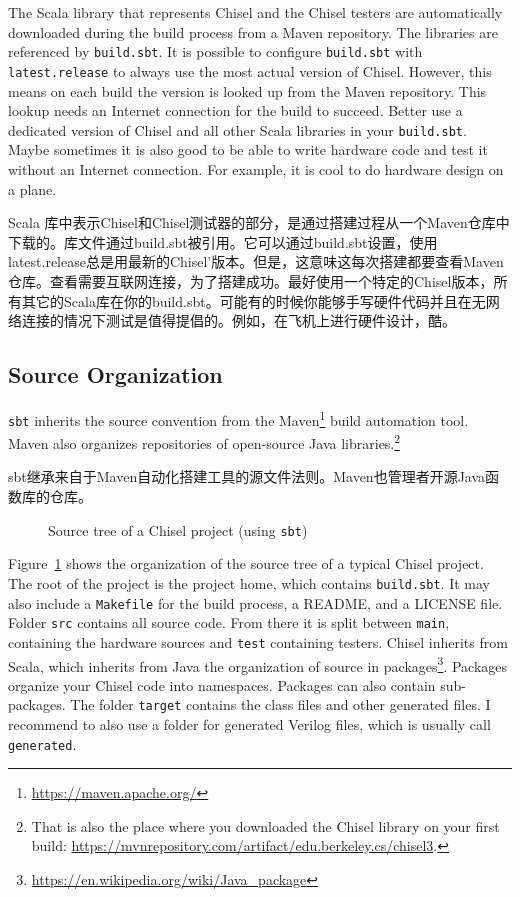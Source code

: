 \documentclass[%
    10pt,
    headinclude, footexclude,
    openright, %
    notitlepage,
    cleardoubleempty,
    headsepline,
    pointlessnumbers,
    bibtotoc, idxtotoc,
    ]{scrbook}
\newcommand{\code}[1]{{\small{\texttt{#1}}}}
\newcommand{\myref}[2]{\href{#1}{#2}}
\renewcommand{\myref}[2]{{#2}{\footnote{\url{#1}}}}
\begin{document}
The Scala library that represents Chisel and the Chisel testers are automatically
downloaded during the build process from a Maven repository.
The libraries are referenced by \code{build.sbt}. It is possible to configure \code{build.sbt}
with \code{latest.release} to always use the most actual version of Chisel.
However, this means on each build the version is looked up from the Maven
repository. This lookup needs an Internet connection for the build to succeed.
Better use a dedicated version of Chisel and all other Scala libraries in your \code{build.sbt}.
Maybe sometimes it is also good to be able to write hardware code and test it without an Internet connection.
For example, it is cool to do hardware design on a plane.

Scala 库中表示Chisel和Chisel测试器的部分，是通过搭建过程从一个Maven仓库中下载的。库文件通过build.sbt被引用。它可以通过build.sbt设置，使用latest.release总是用最新的Chisel'版本。但是，这意味这每次搭建都要查看Maven仓库。查看需要互联网连接，为了搭建成功。最好使用一个特定的Chisel版本，所有其它的Scala库在你的build.sbt。可能有的时候你能够手写硬件代码并且在无网络连接的情况下测试是值得提倡的。例如，在飞机上进行硬件设计，酷。


\subsection{Source Organization}

\code{sbt} inherits the source convention from the \myref{https://maven.apache.org/}{Maven}
build automation tool. Maven also organizes repositories of open-source Java libraries.\footnote{That is
also the place where you downloaded the Chisel library on your first build:
\url{https://mvnrepository.com/artifact/edu.berkeley.cs/chisel3}.}

sbt继承来自于Maven自动化搭建工具的源文件法则。Maven也管理者开源Java函数库的仓库。

\begin{figure}
\caption{Source tree of a Chisel project (using \code{sbt})}
\label{fig:folders}
\end{figure}

Figure~\ref{fig:folders} shows the organization of the source tree of a typical Chisel project.
The root of the project is the project home, which contains \code{build.sbt}.
It may also include a \code{Makefile} for the build process, a README, and a LICENSE file.
Folder \code{src} contains all source code. From there it is split between \code{main},
containing the hardware sources and \code{test} containing testers.
Chisel inherits from Scala, which inherits from Java the organization of source
in \myref{https://en.wikipedia.org/wiki/Java_package}{packages}.
Packages organize your Chisel code into namespaces. Packages can also contain
sub-packages.
The folder \code{target} contains the class files and other generated files.
I recommend to also use a folder for generated Verilog files, which is usually
call \code{generated}.
\end{document}

